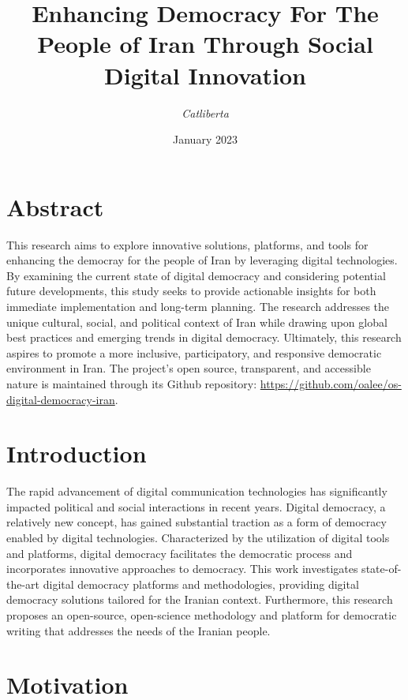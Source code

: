 \documentclass{IEEEtran}
\title{ \Huge \textbf{ Enhancing Democracy For The People of Iran Through Social Digital Innovation } \\[0.5cm]}
\author{

\textit{Catliberta} \\
}
\date{January 2023}
\begin{document}
\maketitle

\section{Abstract}

This research aims to explore innovative solutions, platforms, and tools for enhancing the democray for the people of Iran by leveraging digital technologies. By examining the current state of digital democracy and considering potential future developments, this study seeks to provide actionable insights for both immediate implementation and long-term planning. The research addresses the unique cultural, social, and political context of Iran while drawing upon global best practices and emerging trends in digital democracy. Ultimately, this research aspires to promote a more inclusive, participatory, and responsive democratic environment in Iran. The project's open source, transparent, and accessible nature is maintained through its Github repository: \url{https://github.com/oalee/os-digital-democracy-iran}.

\section{Introduction}

The rapid advancement of digital communication technologies has significantly impacted political and social interactions in recent years. Digital democracy, a relatively new concept, has gained substantial traction as a form of democracy enabled by digital technologies. Characterized by the utilization of digital tools and platforms, digital democracy facilitates the democratic process and incorporates innovative approaches to democracy.
This work investigates state-of-the-art digital democracy platforms and methodologies, providing digital democracy solutions tailored for the Iranian context. Furthermore, this research proposes an open-source, open-science methodology and platform for democratic writing that addresses the needs of the Iranian people.

\section{Motivation}
\end{document}
